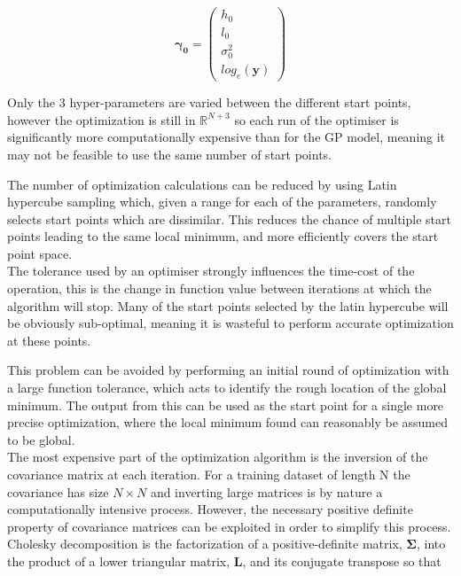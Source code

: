 \documentclass[a4paper,11pt]{report}
\begin{document}
\begin{equation} \label{eq:LGCPstartpoint}
\boldsymbol{\gamma_0} = \left( \begin{array}{cc}
h_0 \\
l_0 \\
\sigma^2_0 \\
log_e(\mathbf{y}) \end{array} \right) 
\end{equation}

Only the 3 hyper-parameters are varied between the different start points, however the optimization is still in \(\mathds{R}^{N+3}\) so each run of the optimiser is significantly more computationally expensive than for the GP model, meaning it may not be feasible to use the same number of start points.  \par

The number of optimization calculations can be reduced by using Latin hypercube sampling which, given a range for each of the parameters, randomly selects start points which are dissimilar. \cite{latin-hyper} This reduces the chance of multiple start points leading to the same local minimum, and more efficiently covers the start point space. \\

The tolerance used by an optimiser strongly influences the time-cost of the operation, this is the change in function value between iterations at which the algorithm will stop. Many of the start points selected by the latin hypercube will be obviously sub-optimal, meaning it is wasteful to perform accurate optimization at these points. \par

This problem can be avoided by performing an initial round of optimization with a large function tolerance, which acts to identify the rough location of the global minimum. The output from this can be used as the start point for a single more precise optimization, where the local minimum found can reasonably be assumed to be global. \\

The most expensive part of the optimization algorithm is the inversion of the covariance matrix at each iteration. For a training dataset of length N the covariance has size \(N \times N\) and inverting large matrices is by nature a computationally intensive process. However, the necessary positive definite property of covariance matrices can be exploited in order to simplify this process. Cholesky decomposition is the factorization of a positive-definite matrix, \(\boldsymbol{\Sigma}\), into the product of a lower triangular matrix, \(\mathbf{L}\), and its conjugate transpose so that
\end{document}

